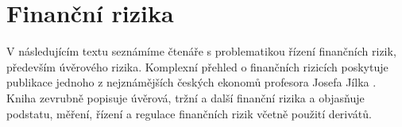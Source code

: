 \documentclass[a4paper,12pt]{report}
\theoremstyle{definition} \newtheorem{definice}[veta]{Definice}
\theoremstyle{remark}
\begin{document}


\section{Finanční rizika}
V následujícím textu seznámíme čtenáře s problematikou řízení finančních rizik, především úvěrového rizika.
Komplexní přehled o finančních rizicích poskytuje publikace  jednoho z nejznámějších českých ekonomů profesora Josefa Jílka \cite{jilek2000}.
Kniha zevrubně popisuje úvěrová, tržní a další finanční rizika a objasňuje podstatu, měření, řízení a regulace finančních rizik včetně použití derivátů.
\end{document}
